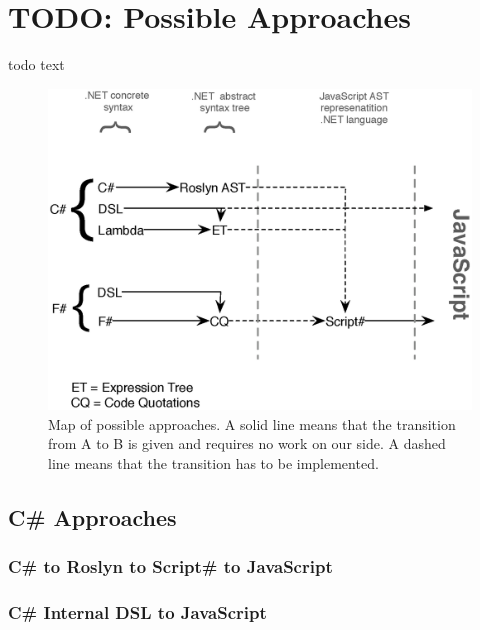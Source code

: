 \section{TODO: Possible Approaches} %
\label{sec:possible_approaches}
	todo text

	\begin{figure}[H]
		\begin{center}
			\centerline{\includegraphics[width=14cm]{resources/images/approachComparison.eps}}
		\end{center}
		\caption{Map of possible approaches. A solid line means that the transition from A to B is given and requires no work on our side. A dashed line means that the transition has to be implemented.}
		\label{approachMap}
	\end{figure}


	\subsection{C\# Approaches} %
	\label{sub:csharp_approaches}
		
		\subsubsection{C\# to Roslyn to Script\# to JavaScript} %
		\label{ssub:c_to_roslyn_to_script_to_javascript}
		

		\subsubsection{C\# Internal DSL to JavaScript} %
		\label{ssub:c_internal_dsl_to_javascript}
		
